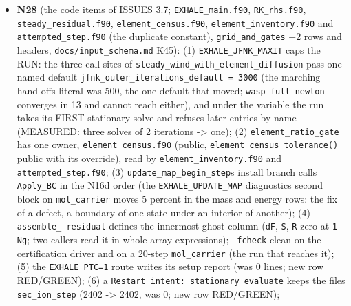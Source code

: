 \documentclass[english,a4paper]{my_memo}
\begin{document}
\begin{itemize}
  helium (N29, launched); (2) the writer-to-loader round trip does not
  return the state: the atomic candidate reloads at \texttt{\textbar{}\textbar{}R\textbar{}\textbar{}} 0.486 instead of
  3.7e-4 because \texttt{load\_IC} rebuilds \texttt{rho} from the species (a consequence of
  1). Tests 42/0 (RED at the build level: the suite does not compile against
  the entry objects); the default certification report byte-identical
  (anchoring under \texttt{EXHALE\_CERT\_ANCHOR=1}). Advisor: rebuild warning-free,
  \texttt{certification} 42/0; one \texttt{neighborhood} and two \texttt{percent} fixed.
\item
  \textbf{N28} (the code items of ISSUES 3.7; \texttt{EXHALE\_main.f90}, \texttt{RK\_rhs.f90},
  \texttt{steady\_residual.f90}, \texttt{element\_census.f90}, \texttt{element\_inventory.f90} and
  \texttt{attempted\_step.f90} (the duplicate constant), \texttt{grid\_and\_gates} +2 rows and
  headers, \texttt{docs/input\_schema.md} K45): (1) \texttt{EXHALE\_JFNK\_MAXIT} caps the RUN:
  the three call sites of \texttt{steady\_wind\_with\_element\_diffusion} pass one named
  default \texttt{jfnk\_outer\_iterations\_default\ =\ 3000} (the marching hand-off\textquotesingle s
  literal was 500, the one default that moved; \texttt{wasp\_full\_newton} converges
  in 13 and cannot reach either), and under the variable the run takes its
  FIRST stationary solve and refuses later entries by name (MEASURED: three
  solves of 2 iterations -\textgreater{} one); (2) \texttt{element\_ratio\_gate} has one owner,
  \texttt{element\_census.f90} (public, \texttt{element\_census\_tolerance()} public with its
  override), read by \texttt{element\_inventory.f90} and \texttt{attempted\_step.f90}; (3)
  \texttt{update\_map\_begin\_step}\textquotesingle s install branch calls \texttt{Apply\_BC} in the N16d
  order (the \texttt{EXHALE\_UPDATE\_MAP} diagnostic\textquotesingle s second block on \texttt{mol\_carrier}
  moves 5 percent in the mass and energy rows: the fix of a defect, a
  boundary of one state under an interior of another); (4) \texttt{assemble\_\ residual} defines the innermost ghost column (\texttt{dF}, \texttt{S}, \texttt{R} zero at
  \texttt{1-Ng}; two callers read it in whole-array expressions); \texttt{-fcheck} clean
  on the certification driver and on a 20-step \texttt{mol\_carrier} (the run that
  reaches it); (5) the \texttt{EXHALE\_PTC=1} route writes its setup report (was 0
  lines; new row RED/GREEN); (6) a \texttt{Restart\ intent:\ stationary\ evaluate}
  keeps the file\textquotesingle s \texttt{sec\_ion\_step} (2402 -\textgreater{} 2402, was 0; new row RED/GREEN);

\end{itemize}
\end{document}
